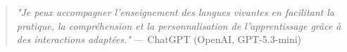 \newpage
\thispagestyle{empty}
\vspace*{\fill}
  \begin{quotation}
    \flushright
    {\large \textit{"Je peux accompagner l’enseignement des langues vivantes en facilitant la pratique, la compréhension et la personnalisation de l’apprentissage grâce à des interactions adaptées."}\vspace{2mm}}
    \flushright --- ChatGPT (OpenAI, GPT-5.3-mini)
  \end{quotation}
\vspace*{\fill}
